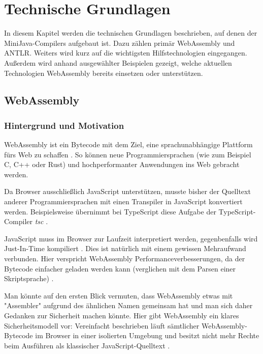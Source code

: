 \chapter{Technische Grundlagen}
\label{cha:Technische-Grundlagen}

In diesem Kapitel werden die technischen Grundlagen beschrieben, auf denen der Mi\-ni\-Ja\-va-Compilers aufgebaut ist. Dazu zählen primär WebAssembly und ANTLR. Weiters wird kurz auf die wichtigsten Hilfstechnologien eingegangen. Außerdem wird anhand ausgewählter Beispielen gezeigt, welche aktuellen Technologien WebAssembly bereits einsetzen oder unterstützen.

\section{WebAssembly}
\subsection{Hintergrund und Motivation}
WebAssembly ist ein Bytecode mit dem Ziel, eine sprachunabhängige Plattform fürs Web zu schaffen \cite{WebAssemblyWebsite} \cite{WebAssemblySpecification}. So können neue Programmiersprachen (wie zum Beispiel C, C++ oder Rust) und hochperformanter Anwendungen ins Web gebracht werden.

Da Browser ausschließlich JavaScript unterstützen, musste bisher der Quelltext anderer Programmiersprachen mit einen Transpiler in JavaScript konvertiert werden. Beispielsweise übernimmt bei TypeScript diese Aufgabe der TypeScript-Compiler \emph{tsc} \cite{TypeScript}.

JavaScript muss im Browser zur Laufzeit interpretiert werden, gegenbenfalls wird Just-In-Time kompiliert \cite{MDNJavaScript}. Dies ist natürlich mit einem gewissen Mehraufwand verbunden. Hier verspricht WebAssembly Performanceverbesserungen, da der Bytecode einfacher geladen werden kann (verglichen mit dem Parsen einer Skriptsprache) \cite{WebAssemblySpecification}.

Man könnte auf den ersten Blick vermuten, dass WebAssembly etwas mit "Assembler" aufgrund des ähnlichen Namen gemeinsam hat und man sich daher Gedanken zur Sicherheit machen könnte. Hier gibt WebAssembly ein klares Sicherheitsmodell vor: Vereinfacht beschrieben läuft sämtlicher WebAssembly-Bytecode im Browser in einer isolierten Umgebung und besitzt nicht mehr Rechte beim Ausführen als klassischer JavaScript-Quelltext \cite{WebAssemblyWebsite} \cite{WebAssemblyW3CPressStandard}.

